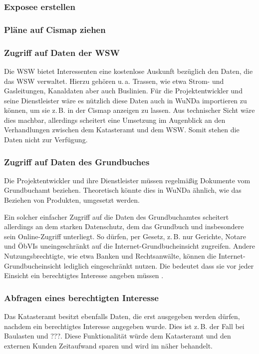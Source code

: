 \subsubsection{Exposee erstellen}
\subsubsection{Pläne auf Cismap ziehen}
\subsubsection{Zugriff auf Daten der WSW}
Die \ac{WSW} bietet Interessenten eine kostenlose Auskunft bezüglich den Daten, die das \ac{WSW} verwaltet.
Hierzu gehören u.\,a. Trassen, wie etwa Strom- und Gasleitungen, Kanaldaten aber auch Buslinien.
Für die Projektentwickler und seine Dienstleister wäre es nützlich diese Daten auch in \ac{WuNDa} importieren zu können, um sie z.\,B. in der Cismap anzeigen zu lassen.
Aus technischer Sicht wäre dies machbar, allerdings scheitert eine Umsetzung  im Augenblick an den Verhandlungen zwischen dem Katasteramt und dem \ac{WSW}.
Somit stehen die Daten nicht zur Verfügung.
\subsubsection{Zugriff auf Daten des Grundbuches}
Die Projektentwickler und ihre Dienstleister müssen regelmäßig Dokumente vom Grundbuchamt beziehen.
Theoretisch könnte dies in \ac{WuNDa} ähnlich, wie das Beziehen von Produkten, umgesetzt werden.

Ein solcher einfacher Zugriff auf die Daten des Grundbuchamtes scheitert allerdings an dem starken Datenschutz, dem das Grundbuch und insbesondere sein Online-Zugriff unterliegt.
So dürfen, per Gesetz, z.\,B. nur Gerichte, Notare und \acp{ÖbVI} uneingeschränkt auf die Internet-Grundbucheinsicht zugreifen.
Andere Nutzungsbrechtigte, wie etwa Banken und Rechtsanwälte, können die Internet-Grundbucheinsicht lediglich eingeschränkt nutzen.
Die bedeutet dass sie vor jeder Einsicht ein berechtigtes Interesse angeben müssen \autocite[vgl.][]{justiz-grundbucheinsicht}.

 
\subsubsection{Abfragen eines berechtigten Interesse}
Das Katasteramt besitzt ebenfalls Daten, die erst ausgegeben werden dürfen, nachdem ein berechtigtes Interesse angegeben wurde.
Dies ist z.\,B. der Fall bei Baulasten und ???.
Diese Funktionalität würde dem Katasteramt und den externen Kunden Zeitaufwand sparen und wird im  näher behandelt.


